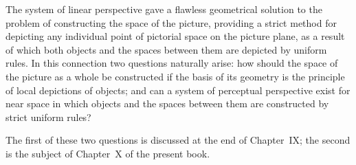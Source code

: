The system of linear perspective gave a flawless geometrical solution to the problem
of constructing the space of the picture, providing a strict method for depicting any
individual point of pictorial space on the picture plane, as a result of which both
objects and the spaces between them are depicted by uniform rules.  In this connection
two questions naturally arise: how should the space of the picture as a whole be
constructed if the basis of its geometry is the principle of local depictions of
objects; and can a system of perceptual perspective exist for near space in which
objects and the spaces between them are constructed by strict uniform rules?

The first of these two questions is discussed at the end of Chapter~IX; the second is
the subject of Chapter~X of the present book.
